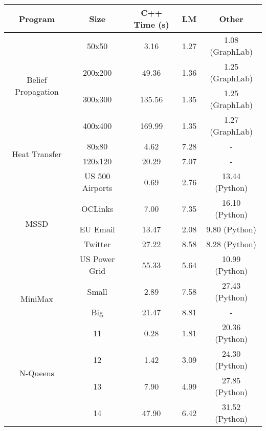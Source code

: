 \begin{tabular}{c | c || c | c | c} \hline
	\textbf{Program} & \textbf{Size} & \textbf{C++ Time} (s) & \textbf{LM} & \textbf{Other} \\ \hline \hline
	\multirow{4}{*}{Belief Propagation}  & 50x50 &  3.16  &  1.27  &  1.08 (GraphLab) \\
		 & 200x200 &  49.36  &  1.36  &  1.25 (GraphLab) \\
		 & 300x300 &  135.56  &  1.35  &  1.25 (GraphLab) \\
		 & 400x400 &  169.99  &  1.35  &  1.27 (GraphLab) \\
	\hline
	\multirow{2}{*}{Heat Transfer}  & 80x80 &  4.62  &  7.28  &  - \\
		 & 120x120 &  20.29  &  7.07  &  - \\
	\hline
	\multirow{5}{*}{MSSD}  & US 500 Airports &  0.69  &  2.76  &  13.44 (Python) \\
		 & OCLinks &  7.00  &  7.35  &  16.10 (Python) \\
		 & EU Email &  13.47  &  2.08  &  9.80 (Python) \\
		 & Twitter &  27.22  &  8.58  &  8.28 (Python) \\
		 & US Power Grid &  55.33  &  5.64  &  10.99 (Python) \\
	\hline
	\multirow{2}{*}{MiniMax}  & Small &  2.89  &  7.58  &  27.43 (Python) \\
		 & Big &  21.47  &  8.81  &  - \\
	\hline
	\multirow{4}{*}{N-Queens}  & 11 &  0.28  &  1.81  &  20.36 (Python) \\
		 & 12 &  1.42  &  3.09  &  24.30 (Python) \\
		 & 13 &  7.90  &  4.99  &  27.85 (Python) \\
		 & 14 &  47.90  &  6.42  &  31.52 (Python) \\
	\hline
\end{tabular}
